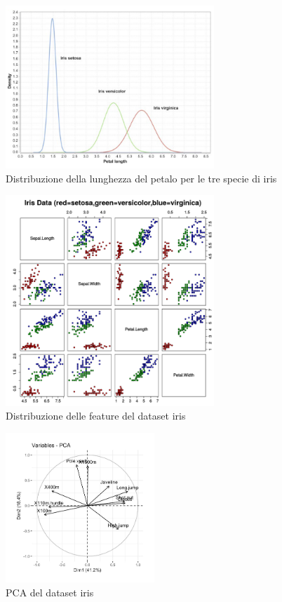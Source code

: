 \begin{figure}[H]
	\centering
	\includegraphics[width=0.7\textwidth]{pictures/irisDistribution.png}
	\caption{Distribuzione della lunghezza del petalo per le tre specie di iris}
	\label{fig:irisPetalLength}
\end{figure}
\begin{figure}[H]
	\centering
	\includegraphics[width=0.7\textwidth]{pictures/irisDistrAttributes.png}
	\caption{Distribuzione delle feature del dataset iris}
	\label{fig:irisPCA}
\end{figure}
\begin{figure}[H]
	\centering
	\includegraphics[width=0.5\textwidth]{pictures/PCAiris.png}
	\caption{PCA del dataset iris}
	\label{fig:irisPCA2D}
\end{figure}
